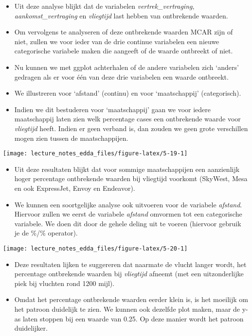 \documentclass[]{memoir}
\providecommand{\tightlist}{%
  \setlength{\itemsep}{0pt}\setlength{\parskip}{0pt}}
\begin{document}
\begin{itemize}
\item
  Uit deze analyse blijkt dat de variabelen \emph{vertrek\_vertraging},
  \emph{aankomst\_vertraging} en \emph{vliegtijd} last hebben van
  ontbrekende waarden.
\item
  Om vervolgens te analyseren of deze ontbrekende waarden MCAR zijn of
  niet, zullen we voor ieder van de drie continue variabelen een nieuwe
  categorische variabele maken die aangeeft of de waarde ontbreekt of
  niet.
\item
  Nu kunnen we met ggplot achterhalen of de andere variabelen zich
  `anders' gedragen als er voor één van deze drie variabelen een waarde
  ontbreekt.
\item
  We illustreren voor `afstand' (continu) en voor `maatschappij'
  (categorisch).
\item
  Indien we dit bestuderen voor `maatschappij' gaan we voor iedere
  maatschappij laten zien welk percentage cases een ontbrekende waarde
  voor \emph{vliegtijd} heeft. Indien er geen verband is, dan zouden we
  geen grote verschillen mogen zien tussen de maatschappijen.
\end{itemize}

\texttt{[image: lecture\_notes\_edda\_files/figure-latex/5-19-1]}

\begin{itemize}
\tightlist
\item
  Uit deze resultaten blijkt dat voor sommige maatschappijen een
  aanzienlijk hoger percentage ontbrekende waarden bij vliegtijd
  voorkomt (SkyWest, Mesa en ook ExpressJet, Envoy en Endeavor).
\item
  We kunnen een soortgelijke analyse ook uitvoeren voor de variabele
  \emph{afstand}. Hiervoor zullen we eerst de variabele \emph{afstand}
  omvormen tot een categorische variabele. We doen dit door de gehele
  deling uit te voeren (hiervoor gebruik je de \%/\% operator).
\end{itemize}

\texttt{[image: lecture\_notes\_edda\_files/figure-latex/5-20-1]}

\begin{itemize}
\tightlist
\item
  Deze resultaten lijken te suggereren dat naarmate de vlucht langer
  wordt, het percentage ontbrekende waarden bij \emph{vliegtijd} afneemt
  (met een uitzonderlijke piek bij vluchten rond 1200 mijl).
\item
  Omdat het percentage ontbrekende waarden eerder klein is, is het
  moeilijk om het patroon duidelijk te zien. We kunnen ook dezelfde plot
  maken, maar de y-as laten stoppen bij een waarde van 0.25. Op deze
  manier wordt het patroon duidelijker.
\end{itemize}
\end{document}
